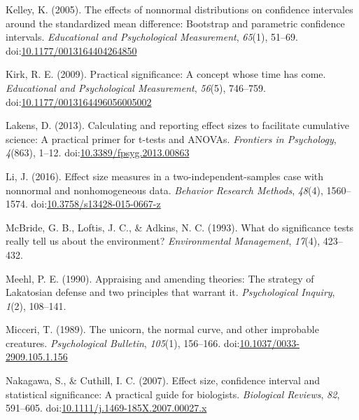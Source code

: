 \documentclass[
  man]{apa6}
\begin{document}
\leavevmode\hypertarget{ref-Kelley_2005}{}%
Kelley, K. (2005). The effects of nonnormal distributions on confidence intervales around the standardized mean difference: Bootstrap and parametric confidence intervals. \emph{Educational and Psychological Measurement}, \emph{65}(1), 51--69. doi:\href{https://doi.org/10.1177/0013164404264850}{10.1177/0013164404264850}

\leavevmode\hypertarget{ref-Kirk_2009}{}%
Kirk, R. E. (2009). Practical significance: A concept whose time has come. \emph{Educational and Psychological Measurement}, \emph{56}(5), 746--759. doi:\href{https://doi.org/10.1177/0013164496056005002\%20}{10.1177/0013164496056005002 }

\leavevmode\hypertarget{ref-Lakens_2013}{}%
Lakens, D. (2013). Calculating and reporting effect sizes to facilitate cumulative science: A practical primer for t-tests and ANOVAs. \emph{Frontiers in Psychology}, \emph{4}(863), 1--12. doi:\href{https://doi.org/10.3389/fpsyg.2013.00863}{10.3389/fpsyg.2013.00863}

\leavevmode\hypertarget{ref-Li_2016}{}%
Li, J. (2016). Effect size measures in a two-independent-samples case with nonnormal and nonhomogeneous data. \emph{Behavior Research Methods}, \emph{48}(4), 1560--1574. doi:\href{https://doi.org/10.3758/s13428-015-0667-z}{10.3758/s13428-015-0667-z}

\leavevmode\hypertarget{ref-McBride_et_al_1993}{}%
McBride, G. B., Loftis, J. C., \& Adkins, N. C. (1993). What do significance tests really tell us about the environment? \emph{Environmental Management}, \emph{17}(4), 423--432.

\leavevmode\hypertarget{ref-Meehl_1990}{}%
Meehl, P. E. (1990). Appraising and amending theories: The strategy of Lakatosian defense and two principles that warrant it. \emph{Psychological Inquiry}, \emph{1}(2), 108--141.

\leavevmode\hypertarget{ref-Micceri_1989}{}%
Micceri, T. (1989). The unicorn, the normal curve, and other improbable creatures. \emph{Psychological Bulletin}, \emph{105}(1), 156--166. doi:\href{https://doi.org/10.1037/0033-2909.105.1.156}{10.1037/0033-2909.105.1.156}

\leavevmode\hypertarget{ref-Nakagawa_and_Cuthill_2007}{}%
Nakagawa, S., \& Cuthill, I. C. (2007). Effect size, confidence interval and statistical significance: A practical guide for biologists. \emph{Biological Reviews}, \emph{82}, 591--605. doi:\href{https://doi.org/10.1111/j.1469-185X.2007.00027.x}{10.1111/j.1469-185X.2007.00027.x}
\end{document}
